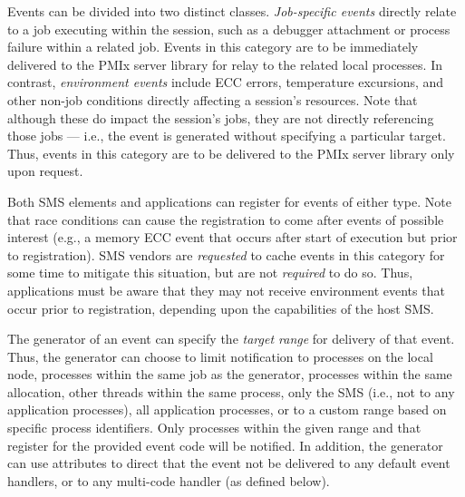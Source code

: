 Events can be divided into two distinct classes. \textit{Job-specific events} directly relate to a job executing within the session, such as a debugger attachment or process failure within a related job. Events in this category are to be immediately delivered to the \ac{PMIx} server library for relay to the related local processes. In contrast, \textit{environment events} include \ac{ECC} errors, temperature excursions, and other non-job conditions directly affecting a session's resources. Note that although these do impact the session's jobs, they are not directly referencing those jobs --- i.e., the event is generated without specifying a particular target. Thus, events in this category are to be delivered to the \ac{PMIx} server library only upon request.

Both \ac{SMS} elements and applications can register for events of either type. Note that race conditions can cause the registration to come after events of possible interest (e.g., a memory \ac{ECC} event that occurs after start of execution but prior to registration). \ac{SMS} vendors are \textit{requested} to cache events in this category for some time to mitigate this situation, but are not \textit{required} to do so. Thus, applications must be aware that they may not receive environment events that occur prior to registration, depending upon the capabilities of the host \ac{SMS}.

The generator of an event can specify the \textit{target range} for delivery of that event. Thus, the generator can choose to limit notification to processes on the local node, processes within the same job as the generator, processes within the same allocation, other threads within the same process, only the \ac{SMS} (i.e., not to any application processes), all application processes, or to a custom range based on specific process identifiers. Only processes within the given range and that register for the provided event code will be notified. In addition, the generator can use attributes to direct that the event not be delivered to any default event handlers, or to any multi-code handler (as defined below).

